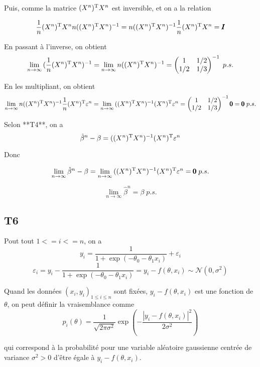 \documentclass[a4paper,12pt]{article}
\begin{document}
Puis, comme la matrice $(X^n)^{\text T}X^n$ est inversible, et on a la relation

$$ \frac{1}{n} (X^n)^{\text T}X^n n ((X^n)^{\text T}X^n)^{-1} = n ((X^n)^{\text T}X^n)^{-1} \frac{1}{n} (X^n)^{\text T}X^n = \pmb{I} $$

En passant à l'inverse, on obtient
$$ \lim_{n \rightarrow \infty} {(\frac{1}{n}(X^n)^{\text T}X^n)^{-1}} = \lim_{n \rightarrow \infty} {n ((X^n)^{\text T}X^n)^{-1}} =
\begin{pmatrix}
	1 & 1 / 2 \\
	1 / 2 & 1 / 3
\end{pmatrix}^{-1} \; p.s. $$

En les multipliant, on obtient
$$ \lim_{n \rightarrow \infty} {n ((X^n)^{\text T}X^n)^{-1} \frac{1}{n}(X^n)^{\text T}\varepsilon^n} = \lim_{n \rightarrow \infty} {((X^n)^{\text T}X^n)^{-1}(X^n)^{\text T}\varepsilon^n} =
\begin{pmatrix}
	1 & 1 / 2 \\
	1 / 2 & 1 / 3
\end{pmatrix}^{-1} \pmb{0} = \pmb{0}
\; p.s. $$

Selon **T4**, on a
$$ \hat \beta^n - \beta = ((X^n){^\text T}X^n)^{-1}(X^n)^{\text T}\varepsilon^n $$

Donc

$$ \lim_{n \rightarrow \infty} {\hat \beta^n - \beta} = \lim_{n \rightarrow \infty} {((X^n){^\text T}X^n)^{-1}(X^n)^{\text T}\varepsilon^n} = \pmb{0} \; p.s. $$

$$ \lim_{n \rightarrow \infty} {\hat \beta^n} = \beta \; p.s. $$

\subsection*{T6}

Pout tout $1 <= i <= n$, on a
$$y_i = \frac{1}{1 + \exp(-\theta_0 - \theta_1x_i)} + \varepsilon_i$$
$$\varepsilon_i = y_i - \frac{1}{1 + \exp(-\theta_0 - \theta_1x_i)} = y_i - f(\theta, x_i) \sim \mathcal{N}(0, \sigma^2)$$

Quand les données $\left(x_i, y_i\right)_{1 \le i \le n}$ sont fixées, $y_i - f(\theta, x_i)$ est une fonction de $\theta$, on peut définir la vraisemblance comme
$$p_i(\theta) = \frac{1}{\sqrt{2\pi\sigma^2}}\exp{\left(-\frac{|y_i - f(\theta, x_i)|^2}{2\sigma^2}\right)}$$

qui correspond à la probabilité pour une variable aléatoire gaussienne centrée de variance $\sigma^2 > 0$ d'être égale à $y_i - f(\theta, x_i)$.
\end{document}
